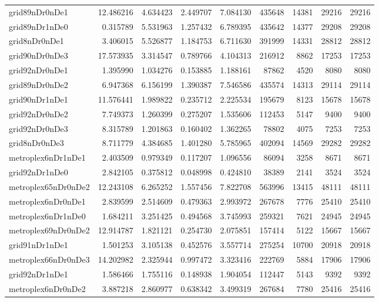 \begin{longtable}{|l|r|r|r|r|r|r|r|r|}
grid89nDr0nDe1 & 12.486216 & 4.634423 & 2.449707 & 7.084130 & 435648 & 14381 & 29216 & 29216 \\
grid89nDr1nDe0 & 0.315789 & 5.531963 & 1.257432 & 6.789395 & 435642 & 14377 & 29208 & 29208 \\
grid8nDr0nDe1 & 3.406015 & 5.526877 & 1.184753 & 6.711630 & 391999 & 14331 & 28812 & 28812 \\
grid90nDr0nDe3 & 17.573935 & 3.314547 & 0.789766 & 4.104313 & 216912 & 8862 & 17253 & 17253 \\
grid92nDr0nDe1 & 1.395990 & 1.034276 & 0.153885 & 1.188161 & 87862 & 4520 & 8080 & 8080 \\
grid89nDr0nDe2 & 6.947368 & 6.156199 & 1.390387 & 7.546586 & 435574 & 14313 & 29114 & 29114 \\
grid90nDr1nDe1 & 11.576441 & 1.989822 & 0.235712 & 2.225534 & 195679 & 8123 & 15678 & 15678 \\
grid92nDr0nDe2 & 7.749373 & 1.260399 & 0.275207 & 1.535606 & 112453 & 5147 & 9400 & 9400 \\
grid92nDr0nDe3 & 8.315789 & 1.201863 & 0.160402 & 1.362265 & 78802 & 4075 & 7253 & 7253 \\
grid8nDr0nDe3 & 8.711779 & 4.384685 & 1.401280 & 5.785965 & 402094 & 14569 & 29282 & 29282 \\
metroplex6nDr1nDe1 & 2.403509 & 0.979349 & 0.117207 & 1.096556 & 86094 & 3258 & 8671 & 8671 \\
grid92nDr1nDe0 & 2.842105 & 0.375812 & 0.048998 & 0.424810 & 38389 & 2141 & 3524 & 3524 \\
metroplex65nDr0nDe2 & 12.243108 & 6.265252 & 1.557456 & 7.822708 & 563996 & 13415 & 48111 & 48111 \\
metroplex6nDr0nDe1 & 2.839599 & 2.514609 & 0.479363 & 2.993972 & 267678 & 7776 & 25410 & 25410 \\
metroplex6nDr1nDe0 & 1.684211 & 3.251425 & 0.494568 & 3.745993 & 259321 & 7621 & 24945 & 24945 \\
metroplex69nDr0nDe2 & 12.914787 & 1.821121 & 0.254730 & 2.075851 & 157414 & 5122 & 15667 & 15667 \\
grid91nDr1nDe1 & 1.501253 & 3.105138 & 0.452576 & 3.557714 & 275254 & 10700 & 20918 & 20918 \\
metroplex66nDr0nDe3 & 14.202982 & 2.325944 & 0.997472 & 3.323416 & 222769 & 5884 & 17906 & 17906 \\
grid92nDr1nDe1 & 1.586466 & 1.755116 & 0.148938 & 1.904054 & 112447 & 5143 & 9392 & 9392 \\
metroplex6nDr0nDe2 & 3.887218 & 2.860977 & 0.638342 & 3.499319 & 267684 & 7780 & 25416 & 25416 \\

\end{longtable}
